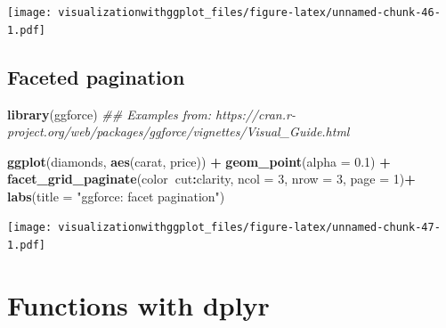 \documentclass[]{krantz}
\makeatletter
\newenvironment{Shaded}{\begin{snugshade}}{\end{snugshade}}
\newcommand{\CommentTok}[1]{\textcolor[rgb]{0.56,0.35,0.01}{\textit{#1}}}
\newcommand{\ControlFlowTok}[1]{\textcolor[rgb]{0.13,0.29,0.53}{\textbf{#1}}}
\newcommand{\DataTypeTok}[1]{\textcolor[rgb]{0.13,0.29,0.53}{#1}}
\newcommand{\DecValTok}[1]{\textcolor[rgb]{0.00,0.00,0.81}{#1}}
\newcommand{\FloatTok}[1]{\textcolor[rgb]{0.00,0.00,0.81}{#1}}
\newcommand{\KeywordTok}[1]{\textcolor[rgb]{0.13,0.29,0.53}{\textbf{#1}}}
\newcommand{\NormalTok}[1]{#1}
\newcommand{\OperatorTok}[1]{\textcolor[rgb]{0.81,0.36,0.00}{\textbf{#1}}}
\newcommand{\StringTok}[1]{\textcolor[rgb]{0.31,0.60,0.02}{#1}}
\newenvironment{kframe}{%
\medskip{}
\setlength{\fboxsep}{.8em}
 \def\at@end@of@kframe{}%
 \ifinner\ifhmode%
  \def\at@end@of@kframe{\end{minipage}}%
  \begin{minipage}{\columnwidth}%
 \fi\fi%
 \def\FrameCommand##1{\hskip\@totalleftmargin \hskip-\fboxsep
 \colorbox{shadecolor}{##1}\hskip-\fboxsep
     \hskip-\linewidth \hskip-\@totalleftmargin \hskip\columnwidth}%
 \MakeFramed {\advance\hsize-\width
   \@totalleftmargin\z@ \linewidth\hsize
   \@setminipage}}%
 {\par\unskip\endMakeFramed%
 \at@end@of@kframe}
\renewenvironment{Shaded}{\begin{kframe}}{\end{kframe}}
\makeatother
\begin{document}
\texttt{[image: visualizationwithggplot\_files/figure-latex/unnamed-chunk-46-1.pdf]}

\hypertarget{faceted-pagination}{%
\subsection{Faceted pagination}\label{faceted-pagination}}

\begin{Shaded}
\begin{Highlighting}[]
\KeywordTok{library}\NormalTok{(ggforce)}
\CommentTok{## Examples from: https://cran.r-project.org/web/packages/ggforce/vignettes/Visual_Guide.html}


\KeywordTok{ggplot}\NormalTok{(diamonds, }\KeywordTok{aes}\NormalTok{(carat, price)) }\OperatorTok{+}
\StringTok{  }\KeywordTok{geom_point}\NormalTok{(}\DataTypeTok{alpha =} \FloatTok{0.1}\NormalTok{) }\OperatorTok{+}
\StringTok{  }\KeywordTok{facet_grid_paginate}\NormalTok{(color}\OperatorTok{~}\NormalTok{cut}\OperatorTok{:}\NormalTok{clarity, }\DataTypeTok{ncol =} \DecValTok{3}\NormalTok{, }\DataTypeTok{nrow =} \DecValTok{3}\NormalTok{, }\DataTypeTok{page =} \DecValTok{1}\NormalTok{)}\OperatorTok{+}
\StringTok{  }\KeywordTok{labs}\NormalTok{(}\DataTypeTok{title =} \StringTok{"ggforce: facet pagination"}\NormalTok{)}
\end{Highlighting}
\end{Shaded}

\texttt{[image: visualizationwithggplot\_files/figure-latex/unnamed-chunk-47-1.pdf]}

\hypertarget{functions-with-dplyr}{%
\section{Functions with dplyr}\label{functions-with-dplyr}}

\begin{Shaded}
\end{Shaded}
\end{document}
